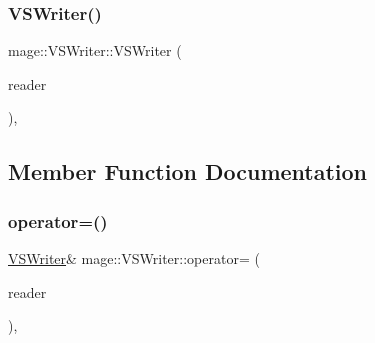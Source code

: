 \hypertarget{classmage_1_1_v_s_writer_ac832695702725d55e8b5ded2917758d9}{}\label{classmage_1_1_v_s_writer_ac832695702725d55e8b5ded2917758d9} 
\subsubsection{\texorpdfstring{V\+S\+Writer()}{VSWriter()}\hspace{0.1cm}{\footnotesize\ttfamily [2/2]}}
{\footnotesize\ttfamily mage\+::\+V\+S\+Writer\+::\+V\+S\+Writer (\begin{DoxyParamCaption}\item[{const \hyperlink{classmage_1_1_v_s_writer}{V\+S\+Writer} \&}]{reader }\end{DoxyParamCaption})\hspace{0.3cm}{\ttfamily [private]}, {\ttfamily [delete]}}



\subsection{Member Function Documentation}
\hypertarget{classmage_1_1_v_s_writer_a3c961e3ef27f93b5ecf953c81844f6c6}{}\label{classmage_1_1_v_s_writer_a3c961e3ef27f93b5ecf953c81844f6c6} 
\subsubsection{\texorpdfstring{operator=()}{operator=()}}
{\footnotesize\ttfamily \hyperlink{classmage_1_1_v_s_writer}{V\+S\+Writer}\& mage\+::\+V\+S\+Writer\+::operator= (\begin{DoxyParamCaption}\item[{const \hyperlink{classmage_1_1_v_s_writer}{V\+S\+Writer} \&}]{reader }\end{DoxyParamCaption})\hspace{0.3cm}{\ttfamily [private]}, {\ttfamily [delete]}}

\hypertarget{classmage_1_1_v_s_writer_afda5e71bc0c5c836ab439e2572dcd685}{}\label{classmage_1_1_v_s_writer_afda5e71bc0c5c836ab439e2572dcd685} 

